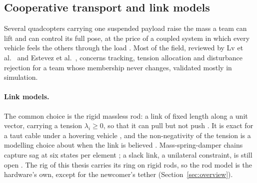 
\subsection{Cooperative transport and link models}
\label{sec:lit_models}

Several quadcopters carrying one suspended payload raise the mass a team can lift and can control its full pose, at
the price of a coupled system in which every vehicle feels the others through the load \cite{tudelft,
mohammadiDecentralizedMotionControl2018}. Most of the field, reviewed by Lv et al.\ \cite{lv2026review} and Estevez
et al.\ \cite{estevezReviewAerialTransportation2024}, concerns tracking, tension allocation and disturbance rejection
for a team whose membership never changes, validated mostly in simulation.

\paragraph{Link models.} The common choice is the rigid massless rod: a link of fixed length along a unit vector,
carrying a tension $\lambda_i \ge 0$, so that it can pull but not push \cite{efficient, wahbaKinodynamicMotionPlanning2024}.
It is exact for a taut cable under a hovering vehicle \cite{michael2011cooperative}, and the non-negativity of the
tension is a modelling choice about when the link is believed \cite{six2018flying}. Mass-spring-damper chains capture
sag at six states per element \cite{distributedNMPC}; a slack link, a unilateral constraint, is still open
\cite{efficient}. The rig of this thesis carries its ring on rigid rods, so the rod model is the hardware's own, except
for the newcomer's tether (Section~\ref{sec:overview}).

